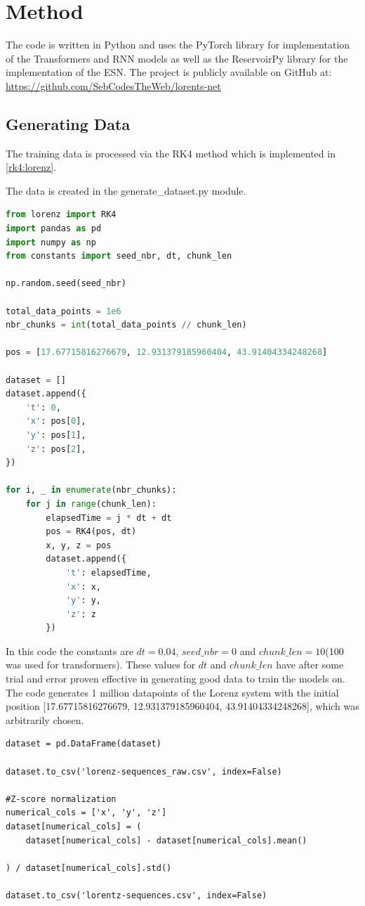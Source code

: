 \documentclass[11pt]{article}
\begin{document}
\section{Method}
The code is written in Python and uses the PyTorch library for implementation of the Transformers and RNN models as well as the ReservoirPy library for the implementation of the ESN. The project is publicly available on GitHub at: \url{https://github.com/SebCodesTheWeb/lorents-net}


\subsection{Generating Data}

The training data is processed via the RK4 method which is implemented in \ref{rk4:lorenz}.

The data is created in the {generate\_dataset.py} module.

\begin{lstlisting}[language=Python]
from lorenz import RK4
import pandas as pd
import numpy as np
from constants import seed_nbr, dt, chunk_len

np.random.seed(seed_nbr)

total_data_points = 1e6
nbr_chunks = int(total_data_points // chunk_len)

pos = [17.67715816276679, 12.931379185960404, 43.91404334248268]

dataset = []
dataset.append({
    't': 0,
    'x': pos[0],
    'y': pos[1],
    'z': pos[2],
})

for i, _ in enumerate(nbr_chunks):
    for j in range(chunk_len):
        elapsedTime = j * dt + dt
        pos = RK4(pos, dt)
        x, y, z = pos
        dataset.append({
            't': elapsedTime,
            'x': x,
            'y': y,
            'z': z
        })
\end{lstlisting}

In this code the constants are $dt = 0.04$, $seed\_nbr = 0$ and $chunk\_len = 10$(100 was used for transformers). These values for $dt$ and $chunk\_len$ have after some trial and error proven effective in generating good data to train the models on. The code generates 1 million datapoints of the Lorenz system with the initial position [17.67715816276679, 12.931379185960404, 43.91404334248268], which was arbitrarily chosen. 

\begin{lstlisting}
dataset = pd.DataFrame(dataset)

dataset.to_csv('lorenz-sequences_raw.csv', index=False)

#Z-score normalization
numerical_cols = ['x', 'y', 'z']
dataset[numerical_cols] = (
    dataset[numerical_cols] - dataset[numerical_cols].mean()

) / dataset[numerical_cols].std()

dataset.to_csv('lorentz-sequences.csv', index=False)
\end{lstlisting}
\end{document}
